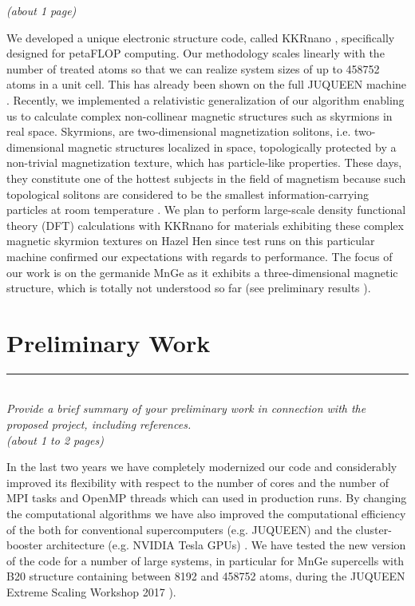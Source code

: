 \documentclass [a4paper, 12pt]{article}
\begin{document}
\textit{(about 1 page)}

We developed a unique electronic structure code, called KKRnano \cite{zeller_towards_2008,thiess_massively_2012},
specifically designed for petaFLOP computing. Our methodology scales linearly
with the number of treated atoms so that we can realize system sizes of up to 
458752  atoms in a unit cell. This has already been shown on the full JUQUEEN
machine \cite{brommel_juqueen_2017}. Recently, we implemented a relativistic generalization of our algorithm 
enabling us to calculate complex non-collinear magnetic structures such as skyrmions
in real space. Skyrmions, are two-dimensional magnetization solitons, i.e. two-dimensional
magnetic structures localized in space, topologically protected by a non-trivial
magnetization texture, which has particle-like properties. 
These days, they constitute one of the hottest subjects in the field of 
magnetism because such topological solitons are considered to be the smallest 
information-carrying particles at room temperature \cite{fert_skyrmions_2013}.  
We plan to perform large-scale density functional theory (DFT) calculations with 
KKRnano for materials exhibiting these complex magnetic skyrmion textures on Hazel Hen 
since test runs on this particular machine confirmed our expectations with regards to performance. 
The focus of our work is on the germanide MnGe as it exhibits a three-dimensional magnetic structure,
which is totally not understood so far (see preliminary results
\cite{tanigaki_real-space_2015,bornemann_investigation_2017}).

\section{Preliminary Work}
\rule{\textwidth}{0.4pt}\\
\textit{Provide a brief summary of your preliminary work in connection with the proposed project, including references.}\\

\textit{(about 1 to 2 pages)}


In the last two years we have completely modernized our code and considerably improved 
its flexibility with respect to the number of cores and the number of MPI tasks and
OpenMP threads which can used in production runs. By changing the computational algorithms
we have also improved the computational efficiency of the both for conventional
supercomputers (e.g. JUQUEEN) and the cluster-booster architecture
(e.g. NVIDIA Tesla GPUs) \cite{dutot_addressing_2016}. 
We have tested the new version of the code for a number of large systems, 
in particular for MnGe supercells with B20 structure containing between 8192 and 458752 atoms,
during the JUQUEEN Extreme Scaling Workshop 2017 \cite{brommel_juqueen_2017}). 
\end{document}
